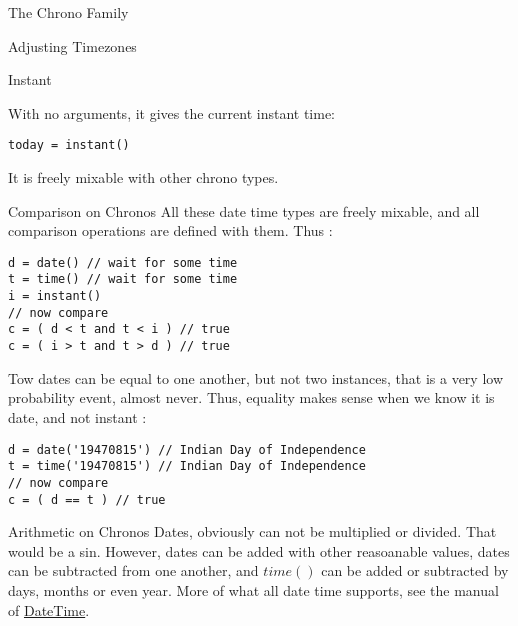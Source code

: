 \begin{section}{The Chrono Family}
\begin{subsection}{Adjusting Timezones}
\end{subsection}


\begin{subsection}{Instant}

With no arguments, it gives the current instant time:

\begin{lstlisting}[style=JexlStyle]
today = instant()
\end{lstlisting}

It is freely mixable with other chrono types.

\end{subsection}


\begin{subsection}{Comparison on Chronos}
All these date time types are freely mixable, 
and all comparison operations are defined with them.
Thus :

\begin{lstlisting}[style=JexlStyle]
d = date() // wait for some time 
t = time() // wait for some time 
i = instant()
// now compare 
c = ( d < t and t < i ) // true 
c = ( i > t and t > d ) // true 
\end{lstlisting}

Tow dates can be equal to one another, but not two instances,
that is a very low probability event, almost never.
Thus, equality makes sense when we know it is date, and not instant :

\begin{center}\begin{minipage}{\linewidth}
\begin{lstlisting}[style=JexlStyle]
d = date('19470815') // Indian Day of Independence  
t = time('19470815') // Indian Day of Independence  
// now compare 
c = ( d == t ) // true 
\end{lstlisting}
\end{minipage}\end{center}

\end{subsection}

\begin{subsection}{Arithmetic on Chronos}
Dates, obviously can not be multiplied or divided.
That would be a sin. However, dates can be added with other reasoanable values, 
dates can be subtracted from one another, and $time()$ can be added or subtracted by days, months or even year.
More of what all date time supports, 
see the manual of \href{http://joda-time.sourceforge.net/apidocs/org/joda/time/DateTime.html}{DateTime}.


\end{subsection}
\end{section}
